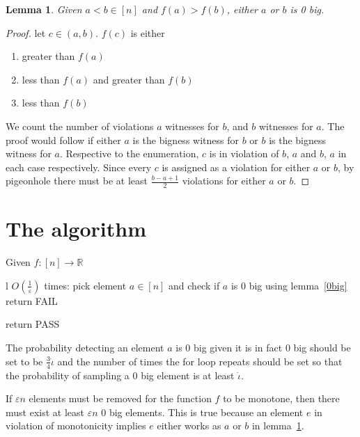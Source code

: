 \documentclass{article}
\newtheorem{lemma}[theorem]{Lemma}
\begin{document}
\begin{lemma}\label{violation_bigness_correspondance}
    Given \(a<b\in [n]\) and \(f(a)>f(b)\), either \(a\) or \(b\) is 0 big.
\end{lemma}
\begin{proof}
    let \(c\in (a,b)\). \(f(c)\) is either
    \begin{enumerate}
        \item greater than \(f(a)\)
        \item less than \(f(a)\) and greater than \(f(b)\)
        \item less than \(f(b)\)
    \end{enumerate}
    We count the number of violations \(a\) witnesses for \(b\), and \(b\) witnesses for \(a\). The proof would follow if either \(a\) is the bigness witness for \(b\) or \(b\) is the bigness witness for \(a\). 
    Respective to the enumeration, \(c\) is in violation of \(b\), \( a\) and \( b\), \(a\) in each case respectively. Since every \(c\) is assigned as a violation for either \(a\) or \(b\), by pigeonhole there must be at least \(\frac{b-a+1}{2}\) violations for either \(a \) or \(b\). 
\end{proof}


\section{The algorithm}

Given \(f:[n]\rightarrow \mathbb R\)
\begin{algorithmic}
    \For l \(O(\frac{1}{\varepsilon})\) times:
        \State pick element \(a\in[n]\) and check if \(a\) is 0 big using lemma~\ref{0big}
            \State return FAIL
        \EndIf
    \EndFor

\State return PASS
\end{algorithmic}


The probability detecting an element \(a\) is 0 big given it is in fact 0 big should be set to be \(\frac{3}{4} \dot\iota\) and the number of times the for loop repeats should be set so that the probability of sampling a 0 big element is at least \(\dot \iota\). 

If \(\varepsilon n\) elements must be removed for the function \(f\) to be monotone, then there must exist at least \(\varepsilon n\) 0 big elements. This is true because an element \(e\) in violation of monotonicity implies \(e\) either works as \(a\) or \(b\) in lemma~\ref{violation_bigness_correspondance}. 
\end{document}
